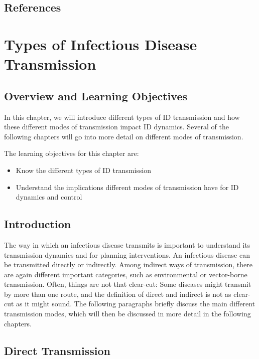\documentclass[]{book}
\providecommand{\tightlist}{%
  \setlength{\itemsep}{0pt}\setlength{\parskip}{0pt}}
\theoremstyle{definition}
\theoremstyle{definition}
\theoremstyle{definition}
\theoremstyle{remark}
\begin{document}
\section{References}\label{references-4}

\chapter{Types of Infectious Disease
Transmission}\label{types-of-infectious-disease-transmission}

\section{Overview and Learning
Objectives}\label{overview-and-learning-objectives-4}

In this chapter, we will introduce different types of ID transmission
and how these different modes of transmission impact ID dynamics.
Several of the following chapters will go into more detail on different
modes of transmission.

The learning objectives for this chapter are:

\begin{itemize}
\tightlist
\item
  Know the different types of ID transmission
\item
  Understand the implications different modes of transmission have for
  ID dynamics and control
\end{itemize}

\section{Introduction}\label{introduction-4}

The way in which an infectious disease transmits is important to
understand its transmission dynamics and for planning interventions. An
infectious disease can be transmitted directly or indirectly. Among
indirect ways of transmission, there are again different important
categories, such as environmental or vector-borne transmission. Often,
things are not that clear-cut: Some diseases might transmit by more than
one route, and the definition of direct and indirect is not as clear-cut
as it might sound. The following paragraphs briefly discuss the main
different transmission modes, which will then be discussed in more
detail in the following chapters.

\section{Direct Transmission}\label{direct-transmission}
\end{document}
